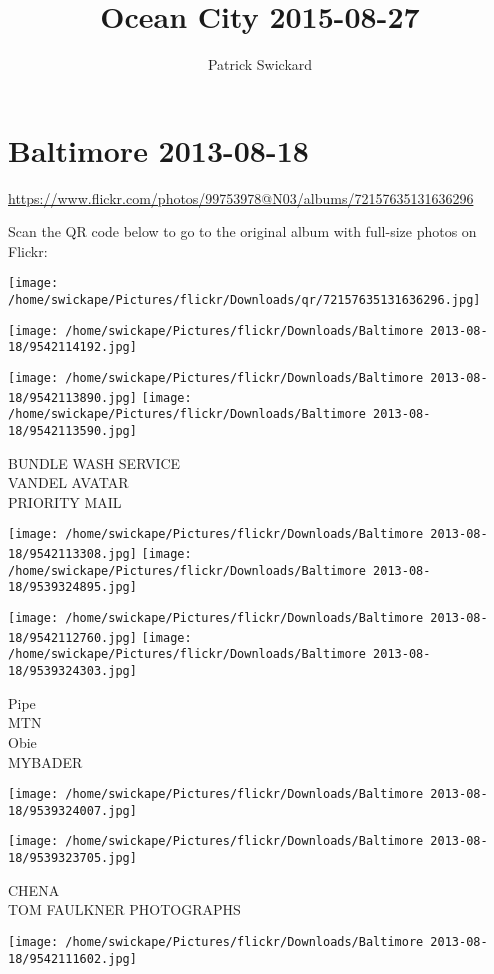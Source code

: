 \documentclass[10pt,letterpaper]{article}
\title{Ocean City 2015-08-27}
\author{Patrick Swickard}
\date{}
\begin{document}
\section*{Baltimore 2013-08-18}

\url{https://www.flickr.com/photos/99753978@N03/albums/72157635131636296}

Scan the QR code below to go to the original album with full-size photos on Flickr:

\texttt{[image: /home/swickape/Pictures/flickr/Downloads/qr/72157635131636296.jpg]}
\pagebreak

\texttt{[image: /home/swickape/Pictures/flickr/Downloads/Baltimore 2013-08-18/9542114192.jpg]}

\vspace{0.25in}
\texttt{[image: /home/swickape/Pictures/flickr/Downloads/Baltimore 2013-08-18/9542113890.jpg]}
\texttt{[image: /home/swickape/Pictures/flickr/Downloads/Baltimore 2013-08-18/9542113590.jpg]}

BUNDLE WASH SERVICE\\
VANDEL AVATAR\\
PRIORITY MAIL
\pagebreak

\texttt{[image: /home/swickape/Pictures/flickr/Downloads/Baltimore 2013-08-18/9542113308.jpg]}
\texttt{[image: /home/swickape/Pictures/flickr/Downloads/Baltimore 2013-08-18/9539324895.jpg]}

\texttt{[image: /home/swickape/Pictures/flickr/Downloads/Baltimore 2013-08-18/9542112760.jpg]}
\texttt{[image: /home/swickape/Pictures/flickr/Downloads/Baltimore 2013-08-18/9539324303.jpg]}

Pipe\\
MTN\\
Obie\\
MYBADER
\pagebreak

\texttt{[image: /home/swickape/Pictures/flickr/Downloads/Baltimore 2013-08-18/9539324007.jpg]}

\vspace{0.25in}
\texttt{[image: /home/swickape/Pictures/flickr/Downloads/Baltimore 2013-08-18/9539323705.jpg]}

CHENA\\
TOM FAULKNER PHOTOGRAPHS
\pagebreak

\texttt{[image: /home/swickape/Pictures/flickr/Downloads/Baltimore 2013-08-18/9542111602.jpg]}
\end{document}
